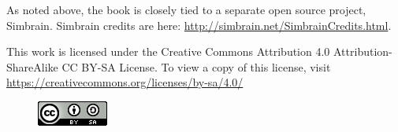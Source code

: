 As noted above, the book is closely tied to a separate open source project, Simbrain. Simbrain credits are here: \url{http://simbrain.net/SimbrainCredits.html}. 

This work is licensed under the Creative Commons Attribution 4.0 Attribution-ShareAlike 
CC BY-SA  License. To view a copy of this license, visit \url{https://creativecommons.org/licenses/by-sa/4.0/}

\begin{figure}[h]
\includegraphics[scale=.7]{./images/CC_License.png}
\end{figure}

